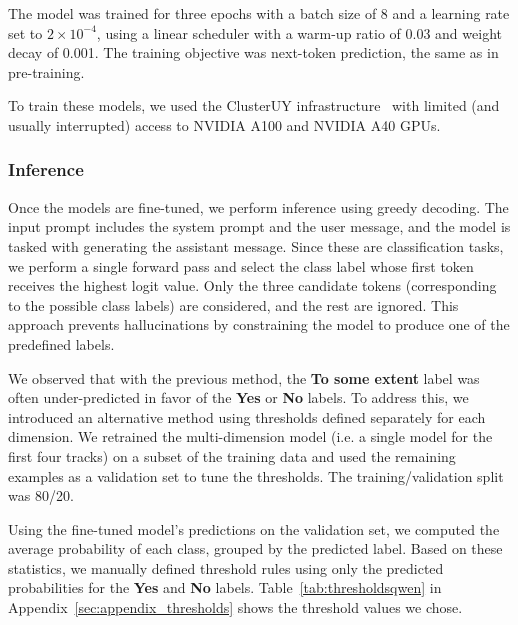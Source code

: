 \documentclass[11pt]{article}
\begin{document}
The model was trained for three epochs with a batch size of 8 and a learning rate set to $2 \times 10^{-4}$, using a linear scheduler with a warm-up ratio of 0.03 and weight decay of 0.001.
The training objective was next-token prediction, the same as in pre-training.

To train these models, we used the ClusterUY infrastructure~\cite{clusteruy} with limited (and usually interrupted) access to NVIDIA A100 and NVIDIA A40 GPUs.






\subsubsection{Inference}





Once the models are fine-tuned, we perform inference using greedy decoding.
The input prompt includes the system prompt and the user message, and the model is tasked with generating the assistant message.
Since these are classification tasks, we perform a single forward pass and select the class label whose first token receives the highest logit value.
Only the three candidate tokens (corresponding to the possible class labels) are considered, and the rest are ignored.
This approach prevents hallucinations by constraining the model to produce one of the predefined labels.

We observed that with the previous method, the \textbf{To some extent} label was often under-predicted in favor of the \textbf{Yes} or \textbf{No} labels.
To address this, we introduced an alternative method using thresholds defined separately for each dimension.
We retrained the multi-dimension model (i.e. a single model for the first four tracks) on a subset of the training data and used the remaining examples as a validation set to tune the thresholds.
The training/validation split was 80/20.

Using the fine-tuned model’s predictions on the validation set, we computed the average probability of each class, grouped by the predicted label.
Based on these statistics, we manually defined threshold rules using only the predicted probabilities for the \textbf{Yes} and \textbf{No} labels.
Table~\ref{tab:thresholdsqwen} in Appendix~\ref{sec:appendix_thresholds} shows the threshold values we chose.

\end{document}
